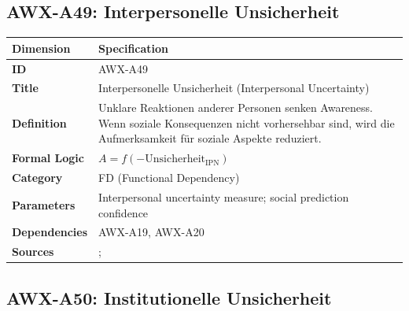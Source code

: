
\subsection{AWX-A49: Interpersonelle Unsicherheit}

\begin{table}[htbp]
\small
\begin{tabular}{p{3cm}p{11cm}}
\toprule
\textbf{Dimension} & \textbf{Specification} \\
\midrule
\textbf{ID} & AWX-A49 \\
\textbf{Title} & Interpersonelle Unsicherheit (Interpersonal Uncertainty) \\
\textbf{Definition} & Unklare Reaktionen anderer Personen senken Awareness. Wenn soziale Konsequenzen nicht vorhersehbar sind, wird die Aufmerksamkeit für soziale Aspekte reduziert. \\
\textbf{Formal Logic} & $A = f(-\text{Unsicherheit}_{\text{IPN}})$ \\
\textbf{Category} & FD (Functional Dependency) \\
\textbf{Parameters} & Interpersonal uncertainty measure; social prediction confidence \\
\textbf{Dependencies} & AWX-A19, AWX-A20 \\
\textbf{Sources} & \citet{PAP-fehr2004social}; \citet{bohnet2004trust} \\
\bottomrule
\end{tabular}
\end{table}


\subsection{AWX-A50: Institutionelle Unsicherheit}

